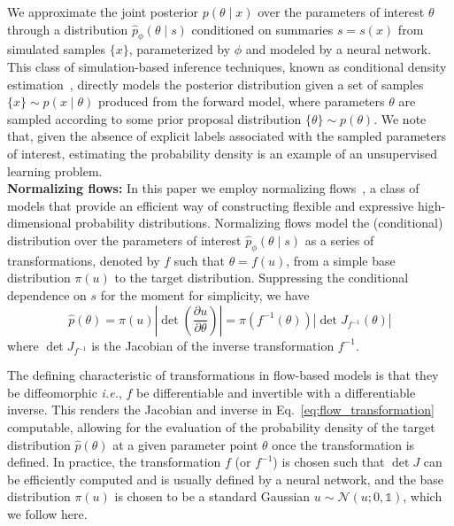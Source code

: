 \documentclass[prd,aps,10pt,nofootinbib,twocolumn,superscriptaddress,preprintnumbers,balancelastpage,longbibliography,floatfix]{revtex4-2}
\begin{document}
We approximate the joint posterior $p(\theta\mid x)$ over the parameters of interest $\theta$ through a distribution $\hat p_\phi(\theta\mid s)$ conditioned on summaries $s=s(x)$ from simulated samples $\{x\}$, parameterized by $\phi$ and modeled by a neural network. This class of simulation-based inference techniques, known as conditional density estimation~\cite{papamakariosFastEpsilonFree2018,cranmer_kyle_2016_198541}, directly models the posterior distribution given a set of samples $\{x\}\sim p(x\mid\theta)$ produced from the forward model, where parameters $\theta$ are sampled according to some prior proposal distribution $\{\theta\}\sim p(\theta)$. We note that, given the absence of explicit labels associated with the sampled parameters of interest, estimating the probability density is an example of an unsupervised learning problem. \\

\noindent
\textbf{Normalizing flows:}
In this paper we employ normalizing flows~\cite{papamakarios2019normalizing,rezende2015variational}, a class of models that provide an efficient way of constructing flexible and expressive high-dimensional probability distributions. Normalizing flows model the (conditional) distribution over the parameters of interest $\hat p_\phi(\theta\mid s)$ as a series of transformations, denoted by $f$ such that $\theta = f(u)$, from a simple base distribution $\pi({u})$ to the target distribution. Suppressing the conditional dependence on $s$ for the moment for simplicity, we have
\begin{equation}
\label{eq:flow_transformation}
\hat{p}({\theta})=\pi(u)\left|\operatorname{det}\left(\frac{\partial u}{\partial {\theta}}\right)\right|=\pi(f^{-1}({\theta}))\left|\operatorname{det}J_{f^{-1}}(\theta)\right|
\end{equation}
where $\operatorname{det}J_{f^{-1}}$ is the Jacobian of the inverse transformation $f^{-1}$.

The defining characteristic of transformations in flow-based models is that they be diffeomorphic \emph{i.e.}, $f$ be differentiable and invertible with a differentiable inverse. This renders the Jacobian and inverse in Eq.~\eqref{eq:flow_transformation} computable, allowing for the evaluation of the probability density of the target distribution $\hat{p}({\theta})$ at a given parameter point $\theta$ once the transformation is defined. In practice, the transformation $f$ (or $f^{-1}$) is chosen such that $\operatorname{det}J$ can be efficiently computed and is usually defined by a neural network, and the base distribution $\pi(u)$ is chosen to be a standard Gaussian $u\sim \mathcal N(u; 0, \mathbb{1})$, which we follow here. 
\end{document}
